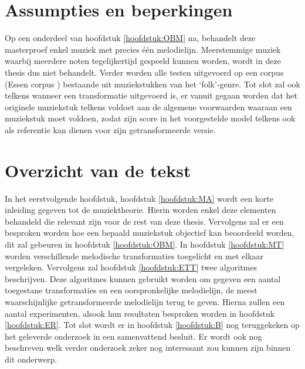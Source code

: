 \section{Assumpties en beperkingen}
Op een onderdeel van hoofdstuk \ref{hoofdstuk:OBM} na, behandelt deze masterproef enkel muziek met precies \'e\'en melodielijn. Meerstemmige muziek waarbij meerdere noten tegelijkertijd gespeeld kunnen worden, wordt in deze thesis dus niet behandelt. Verder worden alle testen uitgevoerd op een corpus (Essen corpus \cite{url:essen}) bestaande uit muziekstukken van het `folk'-genre. Tot slot zal ook telkens wanneer een transformatie uitgevoerd is, er vanuit gegaan worden dat het originele muziekstuk telkens voldoet aan de algemene voorwaarden waaraan een muziekstuk moet voldoen, zodat zijn score in het voorgestelde model telkens ook als referentie kan dienen voor zijn getransformeerde versie. 

\section{Overzicht van de tekst}
In het eerstvolgende hoofdstuk, hoofdstuk \ref{hoofdstuk:MA} wordt een korte inleiding gegeven tot de muziektheorie. Hierin worden enkel deze elementen behandeld die relevant zijn voor de rest van deze thesis. Vervolgens zal er een besproken worden hoe een bepaald muziekstuk objectief kan beoordeeld worden, dit zal gebeuren in hoofdstuk \ref{hoofdstuk:OBM}. In hoofdstuk \ref{hoofdstuk:MT} worden verschillende melodische transformaties toegelicht en met elkaar vergeleken. Vervolgens zal hoofdstuk \ref{hoofdstuk:ETT} twee algoritmes beschrijven. Deze algoritmes kunnen gebruikt worden om gegeven een aantal toegestane transformaties en een oorspronkelijke melodielijn, de meest waarschijnlijke getransformeerde melodielijn terug te geven. Hierna zullen een aantal experimenten, alsook hun resultaten besproken worden in hoofdstuk \ref{hoofdstuk:ER}. Tot slot wordt er in hoofdstuk \ref{hoofdstuk:B} nog teruggekeken op het geleverde onderzoek in een samenvattend besluit. Er wordt ook nog beschreven welk verder onderzoek zeker nog interessant zou kunnen zijn binnen dit onderwerp. 

